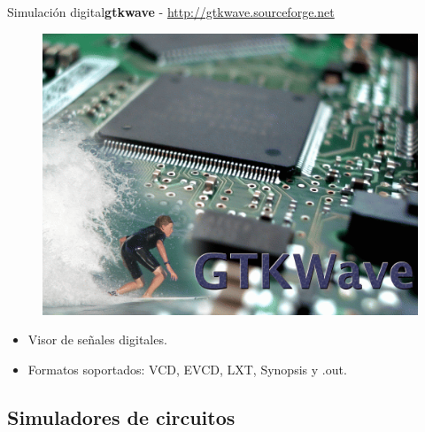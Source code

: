 \documentclass{beamer}
\begin{document}
\begin{frame}{Simulación digital}{\textbf{gtkwave} - \url{http://gtkwave.sourceforge.net}}
  \begin{figure}[!h]
    \centering
    \includegraphics[scale=0.25]{img/gtkwave.png}
  \end{figure}
  \begin{itemize}
  \item Visor de señales digitales.
  \item Formatos soportados: VCD, EVCD,	LXT, Synopsis y .out.
  \end{itemize}
\end{frame}


\subsection[Simuladores de circuitos]{Simuladores de circuitos}
\end{document}
